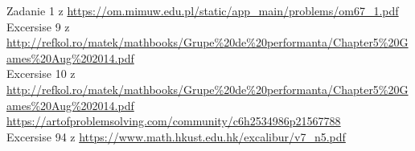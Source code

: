 
 Zadanie 1 z \url{https://om.mimuw.edu.pl/static/app_main/problems/om67_1.pdf} \\
 Excersise 9 z \url{http://refkol.ro/matek/mathbooks/Grupe%20de%20performanta/Chapter5%20Games%20Aug%202014.pdf} \\
 Excersise 10 z \url{http://refkol.ro/matek/mathbooks/Grupe%20de%20performanta/Chapter5%20Games%20Aug%202014.pdf} \\
 \url{https://artofproblemsolving.com/community/c6h2534986p21567788} \\
 Excersise 94 z \url{https://www.math.hkust.edu.hk/excalibur/v7_n5.pdf} \\